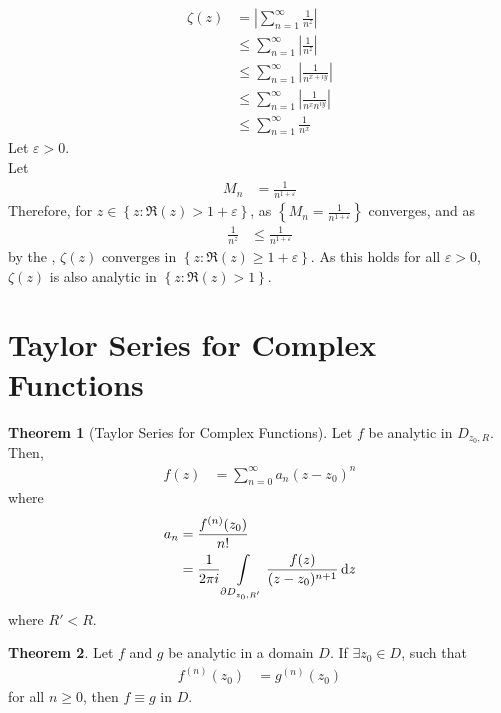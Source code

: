 \documentclass[titlepage, fleqn, a4paper, 12pt, twoside]{article}
\theoremstyle{definition}
\theoremstyle{theorem}
\newtheorem{theorem}{Theorem}
\begin{document}
\begin{solution}
	\begin{align*}
		\zeta(z) & = \left| \sum\limits_{n = 1}^{\infty} \frac{1}{n^z} \right|           \\
                         & \le \sum\limits_{n = 1}^{\infty} \left| \frac{1}{n^z} \right|         \\
                         & \le \sum\limits_{n = 1}^{\infty} \left| \frac{1}{n^{x + i y}} \right| \\
                         & \le \sum\limits_{n = 1}^{\infty} \left| \frac{1}{n^x n^{i y}} \right| \\
                         & \le \sum\limits_{n = 1}^{\infty} \frac{1}{n^x}
	\end{align*}
	Let $\varepsilon > 0$.\\
	Let
	\begin{align*}
		M_n & = \frac{1}{n^{1 + \varepsilon}}
	\end{align*}
	Therefore, for $z \in \left\{ z : \Re(z) > 1 + \varepsilon \right\}$, as $\left\{ M_n = \frac{1}{n^{1 + \varepsilon}} \right\}$ converges, and as
	\begin{align*}
		\frac{1}{n^z} & \le \frac{1}{n^{1 + \varepsilon}}
	\end{align*}
	by the , $\zeta(z)$ converges in $\left\{ z : \Re(z) \ge 1 + \varepsilon \right\}$.
	As this holds for all $\varepsilon > 0$, $\zeta(z)$ is also analytic in $\left\{ z : \Re(z) > 1 \right\}$.
\end{solution}

\section{Taylor Series for Complex Functions}

\begin{theorem}[Taylor Series for Complex Functions]
	Let $f$ be analytic in $D_{z_0,R}$.
	Then,
	\begin{align*}
		f(z) & = \sum\limits_{n = 0}^{\infty} a_n (z - z_0)^n
	\end{align*}
	where
	\begin{align*}
		a_n & = \frac{f^{(n)}(z_0)}{n!} \\
                    & = \frac{1}{2 \pi i} \int\limits_{\partial D_{z_0,R'}} \frac{f(z)}{(z - z_0)^{n + 1}} \dif z
	\end{align*}
	where $R' < R$.
	\label{thm:Taylor_Series_for_Complex_Functions}
\end{theorem}

\begin{theorem}
	Let $f$ and $g$ be analytic in a domain $D$.
	If $\exists z_0 \in D$, such that
	\begin{align*}
		f^{(n)}(z_0) & = g^{(n)}(z_0)
	\end{align*}
	for all $n \ge 0$, then $f \equiv g$ in $D$.
\end{theorem}
\end{document}
